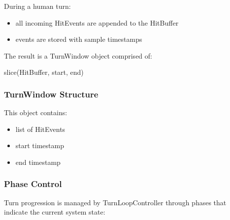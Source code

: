 During a human turn:

\begin{itemize}
\item
  all incoming HitEvents are appended to the HitBuffer
\item
  events are stored with sample timestamps
\end{itemize}

The result is a TurnWindow object comprised of:

slice(HitBuffer, start, end)

\subsubsection{TurnWindow Structure}\label{turnwindow-structure}

This object contains:

\begin{itemize}
\item
  list of HitEvents
\item
  start timestamp
\item
  end timestamp
\end{itemize}

\subsubsection{Phase Control}\label{phase-control}

Turn progression is managed by TurnLoopController through phases that
indicate the current system state:

